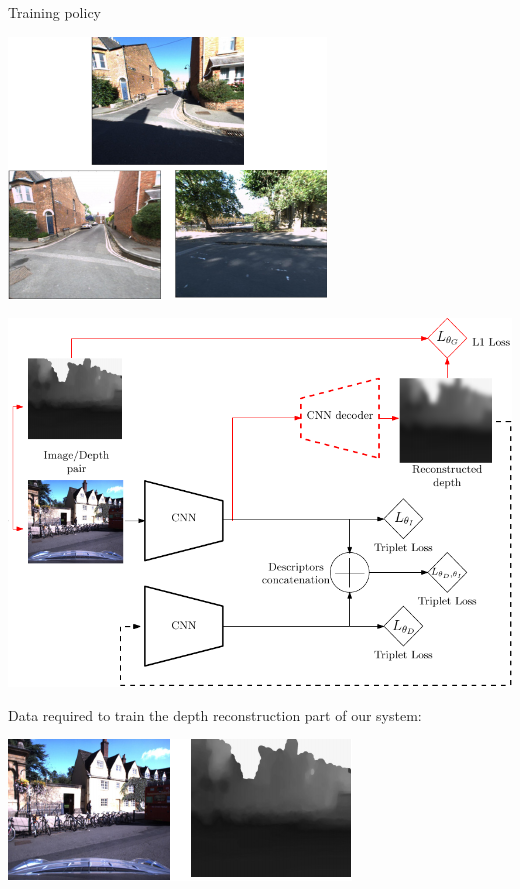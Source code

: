 \begin{frame}{Training policy}
{\begin{minipage}{0.3\linewidth}
		\includegraphics[width=\linewidth]{vect/method/fig3/triplet}	
	\end{minipage}		
	}
	{
	\begin{minipage}{0.6\linewidth}
		\centering
		\includegraphics[width=\linewidth]{vect/method/fig3/6}	
	\end{minipage}\hfill
	\begin{minipage}{0.3\linewidth}
		\raggedright
		Data required to train the depth reconstruction part of our system:
		\vspace{0.5cm}
		
		\includegraphics[width=\linewidth]{vect/method/fig3/pair}	
	\end{minipage}			
	}
\end{frame}


